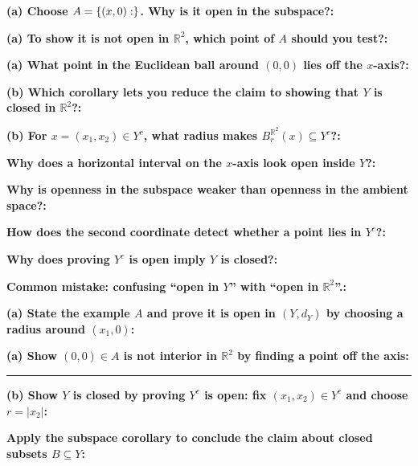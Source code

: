 \documentclass[12pt]{article}
\newcommand{\fillfield}[1]{%
  \par\noindent\textbf{#1:}\enspace\hrulefill\par\vspace{3pt}%
}
\newcommand{\writespace}[1]{\vspace{#1}}
\begin{document}
\bigskip

\begin{tcolorbox}[
  enhanced, breakable,
  colback  = pass2yellow,
  colframe = yellow!65!black,
  fonttitle = \bfseries,
  title = {Pass 2 \enspace\textbf{--}\enspace Proof Recipe Card}
]
\fillfield{(a) Choose $A=\{(x,0):\dotfill\}$. Why is it open in the subspace?}
\fillfield{(a) To show it is not open in $\mathbb{R}^2$, which point of $A$ should you test?}
\fillfield{(a) What point in the Euclidean ball around $(0,0)$ lies off the $x$-axis?}
\fillfield{(b) Which corollary lets you reduce the claim to showing that $Y$ is closed in $\mathbb{R}^2$?}
\fillfield{(b) For $x=(x_1,x_2)\in Y^c$, what radius makes $B_r^{\mathbb{R}^2}(x)\subseteq Y^c$?}
\end{tcolorbox}

\bigskip

\begin{tcolorbox}[
  enhanced, breakable,
  colback  = pass3orange,
  colframe = orange!65!black,
  fonttitle = \bfseries,
  title = {Pass 3 \enspace\textbf{--}\enspace Self-Explanation}
]
\fillfield{Why does a horizontal interval on the $x$-axis look open inside $Y$?}
\fillfield{Why is openness in the subspace weaker than openness in the ambient space?}
\fillfield{How does the second coordinate detect whether a point lies in $Y^c$?}
\fillfield{Why does proving $Y^c$ is open imply $Y$ is closed?}
\fillfield{Common mistake: confusing ``open in $Y$'' with ``open in $\mathbb{R}^2$''.}
\end{tcolorbox}

\newpage

\begin{tcolorbox}[
  enhanced, breakable,
  colback  = pass4purple,
  colframe = purple!55!black,
  fonttitle = \bfseries,
  title = {Pass 4 \enspace\textbf{--}\enspace Skeleton Proof}
]
\noindent\textbf{(a) State the example $A$ and prove it is open in $(Y,d_Y)$ by choosing a radius around $(x_1,0)$:}\par
\writespace{1.8cm}
\noindent\textbf{(a) Show $(0,0)\in A$ is not interior in $\mathbb{R}^2$ by finding a point off the axis:}\par
\writespace{1.6cm}

\noindent\rule{\linewidth}{0.4pt}\vspace{2pt}

\noindent\textbf{(b) Show $Y$ is closed by proving $Y^c$ is open: fix $(x_1,x_2)\in Y^c$ and choose $r=|x_2|$:}\par
\writespace{2.0cm}
\noindent\textbf{Apply the subspace corollary to conclude the claim about closed subsets $B\subseteq Y$:}\par
\writespace{1.0cm}
\end{tcolorbox}
\end{document}
